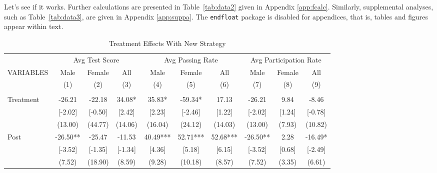 \documentclass[
    12pt,
    letterpaper
]{article}
\theoremstyle{plain}
\newenvironment{tptable}[1][h]{
    \begin{table}[#1]
        \centering
        \begin{threeparttable}[b]
}{
        \end{threeparttable}
    \end{table}
}
\newenvironment{ltptable}[1][h]{
    \begin{landscape}
        \begin{tptable}[#1]
}{
        \end{tptable}
    \end{landscape}
}
\begin{document}
Let's see if it works. Further calculations are presented in Table~\ref{tab:data2} given in Appendix \ref{app:fcalc}. Similarly, supplemental analyses, such as Table~\ref{tab:data3}, are given in Appendix \ref{app:suppa}. The \verb*|endfloat| package is disabled for appendices, that is, tables and figures appear within text.

\begin{ltptable}[h]
\setlength{\tabcolsep}{0pt}
    \small
    \caption{Treatment Effects With New Strategy}
    \begin{tabular*}{\linewidth}{@{\extracolsep{\fill}}lccccccccc@{}}
    \toprule
        \multicolumn{1}{l}{} &
        \multicolumn{3}{c}{Avg Test Score} &
        \multicolumn{3}{c}{Avg Passing Rate} &
        \multicolumn{3}{c}{Avg Participation Rate} \\
        \cmidrule{2-4}
        \cmidrule{5-7}
        \cmidrule{8-10}
VARIABLES   & Male       & Female   & All       & Male          & Female    & All       & Male      & Female& All \\
            &     (1)    & (2)      & (3)       & (4)           & (5)       & (6)       & (7)       & (8)   & (9) \\
\midrule
            &               &               &                   &           &           &           &       &   & \\
Treatment   &      -26.21   &      -22.18   &       34.08*  &       35.83*  &      -59.34*  &       17.13   &      -26.21   &        9.84   &       -8.46   \\
            &     [-2.02]   &     [-0.50]   &      [2.42]   &      [2.23]   &     [-2.46]   &      [1.22]   &     [-2.02]   &      [1.24]   &     [-0.78]   \\
            &     (13.00)   &     (44.77)   &     (14.06)   &     (16.04)   &     (24.12)   &     (14.03)   &     (13.00)   &      (7.93)   &     (10.82)   \\
Post        &      -26.50** &      -25.47   &      -11.53   &       40.49***&       52.71***&       52.68***&      -26.50** &        2.28   &      -16.49*  \\
            &     [-3.52]   &     [-1.35]   &     [-1.34]   &      [4.36]   &      [5.18]   &      [6.15]   &     [-3.52]   &      [0.68]   &     [-2.49]   \\
            &      (7.52)   &     (18.90)   &      (8.59)   &      (9.28)   &     (10.18)   &      (8.57)   &      (7.52)   &      (3.35)   &      (6.61)   \\

\end{tabular*}
\end{ltptable}
\end{document}
